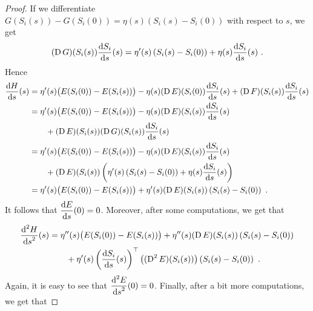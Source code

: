 \begin{proof}
If we differentiate $\displaystyle G(S_i(s))-G(S_i(0))
= \eta(s) \left(S_i(s) - S_i(0)\right)$ with respect to $s$, we get
\[
  (\operatorname{D} G)(S_i(s)) \frac{\mathrm{d}S_i}{\mathrm{d}{s}}(s) = 
\eta'(s) \left(S_i(s) - S_i(0)\right)
+ \eta(s) \frac{\mathrm{d}S_i}{\mathrm{d}{s}}(s) \ .
\]
Hence
\begin{align*}
\frac{\mathrm{d}H}{\mathrm{d}{s}}(s) &= \eta'(s) \big( E(S_i(0)) - E(S_i(s)) \big)
- \eta(s) (\operatorname{D} E)(S_i(0)) \frac{\mathrm{d}S_i}{\mathrm{d}{s}}(s)
+ (\operatorname{D} F)(S_i(s)) \frac{\mathrm{d}S_i}{\mathrm{d}{s}}(s) \\
&= \eta'(s) \big( E(S_i(0)) - E(S_i(s)) \big)
- \eta(s) (\operatorname{D} E)(S_i(s)) \frac{\mathrm{d}S_i}{\mathrm{d}{s}}(s) \\
&\qquad + (\operatorname{D} E)(S_i(s)) (\operatorname{D} G)(S_i(s)) \frac{\mathrm{d}S_i}{\mathrm{d}{s}}(s) \\
&= \eta'(s) \big( E(S_i(0)) - E(S_i(s)) \big)
- \eta(s) (\operatorname{D} E)(S_i(s)) \frac{\mathrm{d}S_i}{\mathrm{d}{s}}(s) \\
&\qquad + (\operatorname{D} E)(S_i(s)) \left( \eta'(s) \left(S_i(s) - S_i(0)\right)
  + \eta(s) \frac{\mathrm{d}S_i}{\mathrm{d}{s}}(s) \right) \\
&= \eta'(s) \big( E(S_i(0)) - E(S_i(s)) \big)
+ \eta'(s) (\operatorname{D} E)(S_i(s)) \left(S_i(s) - S_i(0)\right) \ .
\end{align*}
It follows that $\displaystyle \frac{\mathrm{d}E}{\mathrm{d}{s}}(0) = 0$.  Moreover, after
some computations, we get that
\begin{align*}
\frac{\displaystyle \mathrm{d}^{2}{H}} {\displaystyle \mathrm{d}{s}^{2}}(s)
&= \eta''(s) \big( E(S_i(0)) - E(S_i(s)) \big)
+ \eta''(s) (\operatorname{D} E)(S_i(s)) \left(S_i(s) - S_i(0)\right) \\
&\qquad + \eta'(s)
\left(\frac{\mathrm{d}S_i}{\mathrm{d}{s}}(s)\right)^\top \big((\operatorname{D}^2 E)(S_i(s))\big)
\left(S_i(s)-S_i(0)\right) \ .
\end{align*}
Again, it is easy to see that 
$\displaystyle \frac{\displaystyle \mathrm{d}^{2}{E}} {\displaystyle \mathrm{d}{s}^{2}}(0) = 0$.  Finally, after a bit more
computations, we get that

\end{proof}
